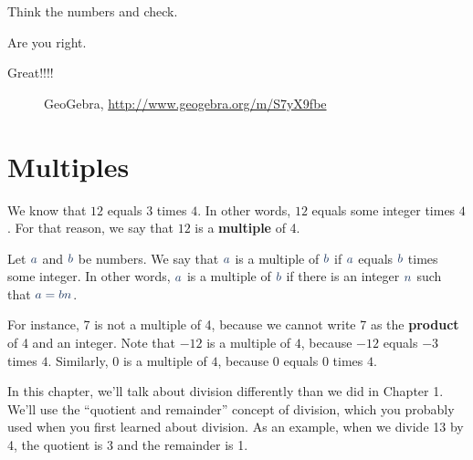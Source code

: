 Think the numbers and check.

Are you right.

Great!!!!

\begin{figure}[H]
\begin{center}
\caption*{GeoGebra, \url{http://www.geogebra.org/m/S7yX9fbe}}
\end{center}
\end{figure}

\section{Multiples}
We know that $12$ equals $3$ times $4$. In other words, $12$ equals some integer times $4$. For that reason, we say that $12$ is a \textbf{multiple}  of 4.
\begin{definition}
Let $\color[rgb]{0.11,0.21,0.37}a$ and $\color[rgb]{0.11,0.21,0.37}b$ be numbers. We say that $\color[rgb]{0.11,0.21,0.37}a$ is a multiple of $\color[rgb]{0.11,0.21,0.37}b$ if $\color[rgb]{0.11,0.21,0.37}a$ equals $\color[rgb]{0.11,0.21,0.37}b$ times some integer. In other words, $\color[rgb]{0.11,0.21,0.37}a$ is a multiple of $\color[rgb]{0.11,0.21,0.37}b$ if there is an integer $\color[rgb]{0.11,0.21,0.37}n$ such that $\color[rgb]{0.11,0.21,0.37}a = bn$.
\end{definition}
For instance, 7 is not a multiple of 4, because we cannot write 7 as the  \textbf{product}  of 4 and an integer. Note that $-12$ is a multiple of $4$, because $-12$ equals $-3$ times $4$. Similarly, $0$ is a multiple of $4$, because $0$ equals $0$ times $4$.

In this chapter, we’ll talk about division differently than we did in Chapter 1. We’ll use the “quotient and remainder” concept of division, which you probably used when you first learned about division. As an example, when we divide 13 by 4, the quotient is 3 and the remainder is 1.

